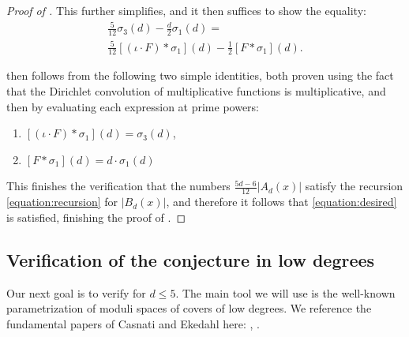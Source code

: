 \documentclass[reqno, 11pt]{amsart}
\begin{document}
\begin{proof}[Proof of ]
This further simplifies, and it then suffices to show the equality: 
\begin{align}
    \label{equation:suffices}
    \frac{5}{12}\sigma_{3}(d) - \frac{d}{2}\sigma_{1}(d)  = \\
    \frac{5}{12}\left[(\iota \cdot F) * \sigma_{1} \right](d) - \frac{1}{2}\left[ F * \sigma_{1} \right](d). 
\end{align}

 then follows from the following two simple identities, both proven using the fact that the Dirichlet convolution of multiplicative functions is multiplicative, and then by evaluating each expression at prime powers: 
\begin{enumerate}
    \item $\left[(\iota \cdot F) * \sigma_{1} \right](d) = \sigma_{3}(d)$,
    \item $\left[ F * \sigma_{1} \right](d) = d \cdot \sigma_{1}(d)$
\end{enumerate}
This finishes the verification that the numbers $\frac{5d-6}{12}|A_{d}(x)|$ satisfy the recursion \eqref{equation:recursion} for $|B_{d}(x)|$, and therefore it follows that \eqref{equation:desired} is satisfied, finishing the proof of .
\end{proof}



\subsection{Verification of the conjecture in low degrees} Our next goal is to verify  for $d \leq 5$. The main tool we will use is the well-known parametrization of moduli spaces of covers of low degrees. We reference the fundamental papers of Casnati and Ekedahl here: \cite{casnatiekedahlI}, \cite{casnati1996covers}.
\end{document}
